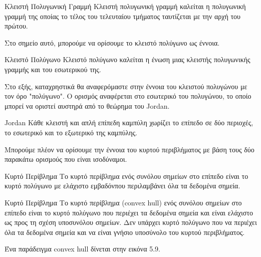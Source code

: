 \documentclass[oneside,12pt]{book}
\theoremstyle{definition}
\begin{document}
\begin{mydefinition}{Κλειστή Πολυγωνική Γραμμή}{}
	Κλειστή πολυγωνική γραμμή καλείται η πολυγωνική γραμμή της οποίας το τέλος του τελευταίου τμήματος ταυτίζεται με την αρχή του πρώτου.
\end{mydefinition}

Στο σημείο αυτό, μπορούμε να ορίσουμε το κλειστό πολύγωνο ως έννοια. \\

\begin{mydefinition}{Κλειστό Πολύγωνο}{}
	Κλειστό πολύγωνο καλείται η ένωση μιας κλειστής πολυγωνικής γραμμής και του εσωτερικού της.
\end{mydefinition}

Στο εξής, καταχρηστικά θα αναφερόμαστε στην έννοια του κλειστού πολυγώνου με τον όρο "πολύγωνο". Ο ορισμός αναφέρεται στο εσωτερικό του πολυγώνου, το οποίο μπορεί να οριστεί αυστηρά από το θεώρημα του Jordan. \\

\begin{mytheorem}{Jordan}{}
	Κάθε κλειστή και απλή επίπεδη καμπύλη χωρίζει το επίπεδο σε δύο περιοχές, το εσωτερικό και το εξωτερικό της καμπύλης.
\end{mytheorem}

Μπορούμε πλέον να ορίσουμε την έννοια του κυρτού περιβλήματος με βάση τους δύο παρακάτω ορισμούς που είναι ισοδύναμοι. \\

\begin{mydefinition}{Κυρτό Περίβλημα}{}
	Το κυρτό περίβλημα ενός συνόλου σημείων στο επίπεδο είναι το κυρτό πολύγωνο με ελάχιστο εμβαδόνπου περιλαμβάνει όλα τα δεδομένα σημεία.
\end{mydefinition}

\begin{mydefinition}{Κυρτό Περίβλημα}{}
	Το κυρτό περίβλημα (convex hull) ενός συνόλου σημείων στο επίπεδο είναι το κυρτό πολύγωνο που περιέχει τα δεδομένα σημεία και είναι ελάχιστο ως προς τη σχέση υποσυνόλου σημείων. Δεν υπάρχει κυρτό πολύγωνο που να περιέχει όλα τα δεδομένα σημεία και να είναι γνήσιο υποσύνολο του κυρτού περιβλήματος.
\end{mydefinition}

Ένα παράδειγμα convex hull δίνεται στην εικόνα 5.9. \\
\end{document}
